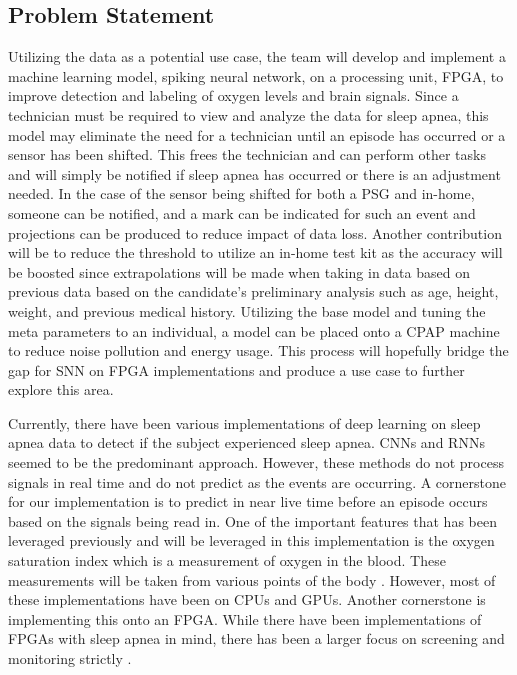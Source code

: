 \documentclass[12pt,titlepage]{article}
\begin{document}
\subsection{Problem Statement}
Utilizing the data as a potential use case, the team will develop and implement a machine learning model, spiking neural network, on a
processing unit, FPGA, to improve detection and labeling of oxygen levels and brain signals.  Since a technician must be required to view
and analyze the data for sleep apnea, this model may eliminate the need for a technician until an episode has occurred or a sensor has been
shifted. This frees the technician and can perform other tasks and will simply be notified if sleep apnea has occurred or there is an adjustment
needed. In the case of the sensor being shifted for both a PSG and in-home, someone can be notified, and a mark can be indicated for such an
event and projections can be produced to reduce impact of data loss. Another contribution will be to reduce the threshold to utilize an in-home
test kit as the accuracy will be boosted since extrapolations will be made when taking in data based on previous data based on the candidate’s
preliminary analysis such as age, height, weight, and previous medical history. Utilizing the base model and tuning the meta parameters to an
individual, a model can be placed onto a CPAP machine to reduce noise pollution and energy usage. This process will hopefully bridge the gap
for SNN on FPGA implementations and produce a use case to further explore this area. 

Currently, there have been various implementations of deep learning on sleep apnea data to detect if the subject experienced sleep apnea. CNNs
and RNNs seemed to be the predominant approach. However, these methods do not process signals in real time and do not predict as the events are
occurring. A cornerstone for our implementation is to predict in near live time before an episode occurs based on the signals being read in.
One of the important features that has been leveraged previously and will be leveraged in this implementation is the oxygen saturation index
which is a measurement of oxygen in the blood. These measurements will be taken from various points of the body \cite{mostafa}.
However, most of these implementations have been on CPUs and GPUs. Another cornerstone is implementing this onto an FPGA. While there have
been implementations of FPGAs with sleep apnea in mind, there has been a larger focus on screening and monitoring strictly \cite{ashmouny}.
\end{document}
